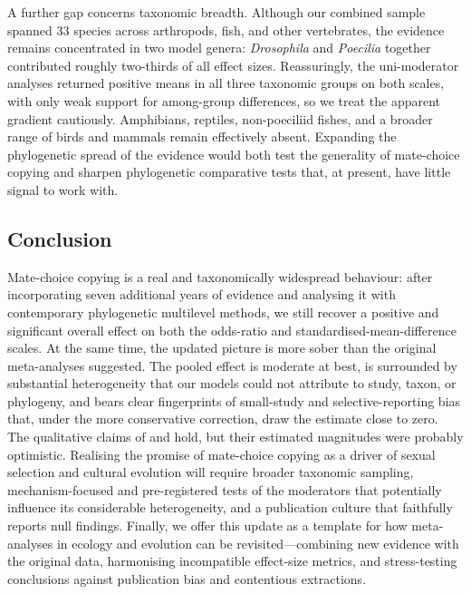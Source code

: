 A further gap concerns taxonomic breadth. Although our combined sample spanned 33 species across arthropods, fish, and other vertebrates, the evidence remains concentrated in two model genera: \textit{Drosophila} and \textit{Poecilia} together contributed roughly two-thirds of all effect sizes. Reassuringly, the uni-moderator analyses returned positive means in all three taxonomic groups on both scales, with only weak support for among-group differences, so we treat the apparent gradient cautiously. Amphibians, reptiles, non-poeciliid fishes, and a broader range of birds and mammals remain effectively absent. Expanding the phylogenetic spread of the evidence would both test the generality of mate-choice copying and sharpen phylogenetic comparative tests that, at present, have little signal to work with.

\subsection{Conclusion}

Mate-choice copying is a real and taxonomically widespread behaviour: after incorporating seven additional years of evidence and analysing it with contemporary phylogenetic multilevel methods, we still recover a positive and significant overall effect on both the odds-ratio and standardised-mean-difference scales. At the same time, the updated picture is more sober than the original meta-analyses suggested. The pooled effect is moderate at best, is surrounded by substantial heterogeneity that our models could not attribute to study, taxon, or phylogeny, and bears clear fingerprints of small-study and selective-reporting bias that, under the more conservative correction, draw the estimate close to zero. The qualitative claims of \textcite{jonesMechanismsSocialInfluence2019} and \textcite{daviesMetaanalysisFactorsInfluencing2020} hold, but their estimated magnitudes were probably optimistic. Realising the promise of mate-choice copying as a driver of sexual selection and cultural evolution will require broader taxonomic sampling, mechanism-focused and pre-registered tests of the moderators that potentially influence its considerable heterogeneity, and a publication culture that faithfully reports null findings. Finally, we offer this update as a template for how meta-analyses in ecology and evolution can be revisited---combining new evidence with the original data, harmonising incompatible effect-size metrics, and stress-testing conclusions against publication bias and contentious extractions.
